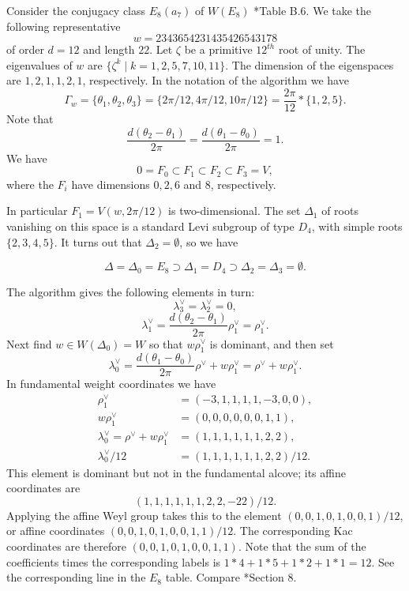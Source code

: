 \documentclass[10pt,leqno]{article}
\newcommand{\ch}[1]{#1^\vee}
\def\p{\pi}
\begin{document}
\begin{exampleplain}
Consider the conjugacy class $E_8(a_7)$ of  $W(E_8)$
\cite{geck_pfeiffer}*{Table B.6}. We take the following
representative
$$
w=2343654231435426543178
$$
of order $d=12$ and length $22$. Let $\zeta$ be a primitive $12^{th}$ root of unity.
The eigenvalues of $w$ are $\{\zeta^k\mid k=1,2,5,7,10,11\}$.
The dimension of the eigenspaces are $1,2,1,1,2,1$, respectively.
In the notation of the algorithm we have
$$
\Gamma_w=\{\theta_1,\theta_2,\theta_3\}=\{2\pi /12, 4\pi /12, 10\pi /12\}=\frac{2\p}{12}*\{1,2,5\}.
$$
Note that
$$
\frac{d(\theta_2-\theta_1)}{2\pi}=\frac{d(\theta_1-\theta_0)}{2\pi}=1.
$$
We have
$$
0=F_0\subset F_1\subset F_2\subset F_3=V,
$$
where the $F_i$ have dimensions $0,2,6$ and $8$, respectively.

In particular $F_1=V(w,2\pi/12)$ is two-dimensional.  The set $\Delta_1$ of roots vanishing on this space
is a standard Levi subgroup of type $D_4$, with simple roots $\{2,3,4,5\}$.
It turns out that $\Delta_2=\emptyset$, so we have

  $$
  \Delta=\Delta_0=E_8\supset \Delta_1=D_4\supset \Delta_2=\Delta_3=\emptyset.
$$

The algorithm gives the following elements in turn:
$$
\ch\lambda_3=\ch\lambda_2=0,
$$
$$
\ch\lambda_1=\frac{d(\theta_2-\theta_1)}{2\pi}\ch\rho_1=\ch\rho_1.
$$
Next find $w\in W(\Delta_0)=W$ so that $w\ch\rho_1$ is dominant, and then set
$$
\ch\lambda_0=\frac{d(\theta_1-\theta_0)}{2\pi}\ch\rho+w\ch\rho_1=\ch\rho+w\ch\rho_1.
$$
In fundamental weight coordinates we have
$$
\begin{aligned}
  \ch\rho_1&=(-3,1,1,1,1,-3,0,0),\\
  w\ch\rho_1&=(0,0,0,0,0,0,1,1),\\
  \ch\lambda_0=\ch\rho+w\ch\rho_1&=  ( 1,1,1,1,1,1,2,2),\\
  \ch\lambda_0/12&=(  1,1,1,1,1,1,2,2)/12.
\end{aligned}
$$
This element is dominant but not in the fundamental alcove; its affine coordinates are
$$
(1,1,1,1,1,1,2,2,-22)/12.
$$
Applying the affine Weyl group takes this to the element $(0,0,1,0,1,0,0,1)/12$,
or affine coordinates  $(0,0,1,0,1,0,0,1,1)/12$. The corresponding  Kac coordinates are therefore $(0,0,1,0,1,0,0,1,1)$.
Note that the sum of the coefficients times the corresponding labels is $1*4+1*5+1*2+1*1=12$.
See the corresponding line in the $E_8$ table. 
Compare \cite{rgly}*{Section 8}.
\end{exampleplain}
\end{document}
